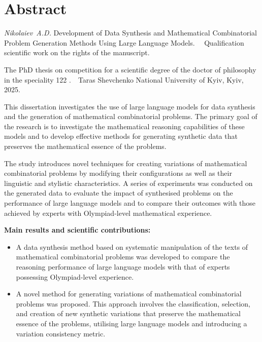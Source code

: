 %
\chapter*{Abstract}

\emph{Nikolaiev~A.D.} Development of Data Synthesis and Mathematical Combinatorial Problem Generation Methods Using Large Language Models. ~\textbf{\textemdash}~Qualification scientific work on the rights of the manuscript.

The PhD thesis on competition for a scientific degree of the doctor of philosophy in the speciality 122 .~\textbf{\textemdash}~Taras Shevchenko National University of Kyiv, Kyiv, 2025.

This dissertation investigates the use of large language models for data synthesis and the generation of mathematical combinatorial problems. The primary goal of the research is to investigate the mathematical reasoning capabilities of these models and to develop effective methods for generating synthetic data that preserves the mathematical essence of the problems.

The study introduces novel techniques for creating variations of mathematical combinatorial problems by modifying their configurations as well as their linguistic and stylistic characteristics. A series of experiments was conducted on the generated data to evaluate the impact of synthesised problems on the performance of large language models and to compare their outcomes with those achieved by experts with Olympiad-level mathematical experience.

\textbf{Main results and scientific contributions:}
\begin{itemize}
    \item A data synthesis method based on systematic manipulation of the texts of mathematical combinatorial problems was developed to compare the reasoning performance of large language models with that of experts possessing Olympiad-level experience.
    \item A novel method for generating variations of mathematical combinatorial problems was proposed. This approach involves the classification, selection, and creation of new synthetic variations that preserve the mathematical essence of the problems, utilising large language models and introducing a variation consistency metric.
\end{itemize}

